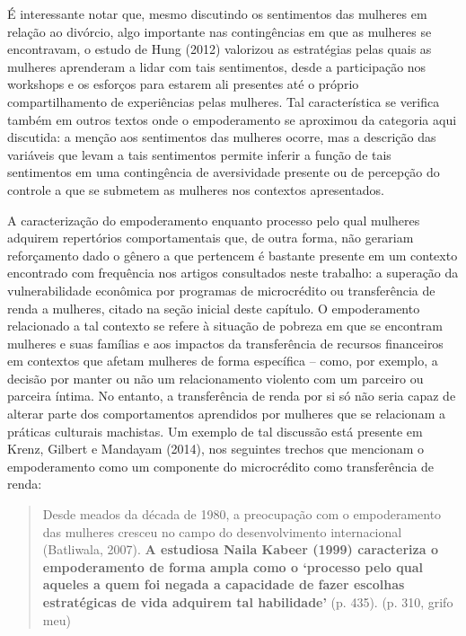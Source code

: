 É interessante notar que, mesmo discutindo os sentimentos das mulheres em relação ao divórcio, algo importante nas contingências em que as mulheres se encontravam, o estudo de Hung (2012) valorizou as estratégias pelas quais as mulheres aprenderam a lidar com tais sentimentos, desde a participação nos workshops e os esforços para estarem ali presentes até o próprio compartilhamento de experiências pelas mulheres. Tal característica se verifica também em outros textos onde o empoderamento se aproximou da categoria aqui discutida: a menção aos sentimentos das mulheres ocorre, mas a descrição das variáveis que levam a tais sentimentos permite inferir a função de tais sentimentos em uma contingência de aversividade presente ou de percepção do controle a que se submetem as mulheres nos contextos apresentados.

A caracterização do empoderamento enquanto processo pelo qual mulheres adquirem repertórios comportamentais que, de outra forma, não gerariam reforçamento dado o gênero a que pertencem é bastante presente em um contexto encontrado com frequência nos artigos consultados neste trabalho: a superação da vulnerabilidade econômica por programas de microcrédito ou transferência de renda a mulheres, citado na seção inicial deste capítulo. O empoderamento relacionado a tal contexto se refere à situação de pobreza em que se encontram mulheres e suas famílias e aos impactos da transferência de recursos financeiros em contextos que afetam mulheres de forma específica – como, por exemplo, a decisão por manter ou não um relacionamento violento com um parceiro ou parceira íntima. No entanto, a transferência de renda por si só não seria capaz de alterar parte dos comportamentos aprendidos por mulheres que se relacionam a práticas culturais machistas. Um exemplo de tal discussão está presente em Krenz, Gilbert e Mandayam (2014), nos seguintes trechos que mencionam o empoderamento como um componente do microcrédito como transferência de renda:

\begin{quote}
    Desde meados da década de 1980, a preocupação com o empoderamento das mulheres cresceu no campo do desenvolvimento internacional (Batliwala, 2007). \textbf{A estudiosa Naila Kabeer (1999) caracteriza o empoderamento de forma ampla como o ‘processo pelo qual aqueles a quem foi negada a capacidade de fazer escolhas estratégicas de vida adquirem tal habilidade’} (p. 435). (p. 310, grifo meu)
\end{quote}

